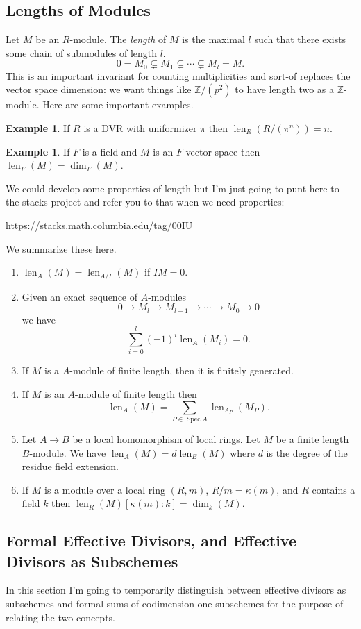 \documentclass[12pt]{article}
\numberwithin{equation}{section}
\theoremstyle{definition}
\newtheorem{example}[theorem]{Example}
\theoremstyle{remark}
\newcommand{\ZZ}{\mathbb{Z}}
\newcommand{\Spec}{\operatorname{Spec}}
\newcommand{\len}{\operatorname{len}}
\begin{document}
\subsection{Lengths of Modules}
Let $M$ be an $R$-module. 
The \emph{length} of $M$ is the maximal $l$ such that there exists some chain of submodules of length $l$. 
 $$ 0 = M_0 \subsetneq M_1 \subsetneq \cdots \subsetneq M_l = M. $$
This is an important invariant for counting multiplicities and sort-of replaces the vector space dimension: we want things like $\ZZ/(p^2)$ to have length two as a $\ZZ$-module. 
Here are some important examples.
\begin{example}
	If $R$ is a DVR with uniformizer $\pi$ then $\len_R(R/(\pi^n)) = n$.
\end{example}
\begin{example}
	If $F$ is a field and $M$ is an $F$-vector space then $\len_F(M)=\dim_F(M)$.
\end{example}

We could develop some properties of length but I'm just going to punt here to the stacks-project and refer you to that when we need properties:
\begin{center}
	\url{https://stacks.math.columbia.edu/tag/00IU}
\end{center}
We summarize these here.
\begin{enumerate}
	\item $\len_A(M) = \len_{A/I}(M)$ if $IM=0$. 
	\item Given an exact sequence of $A$-modules 
	 $$ 0 \to M_l \to M_{l-1} \to \cdots \to M_0 \to 0 $$
	 we have 
	  $$\sum_{i=0}^l (-1)^i \len_A(M_i) =0. $$
	\item If $M$ is a $A$-module of finite length, then it is finitely generated.
	\item If $M$ is an $A$-module of finite length then
	 $$ \len_A(M) = \sum_{P \in \Spec A} \len_{A_P}(M_P).$$
	\item Let $A \to B$ be a local homomorphism of local rings. 
	Let $M$ be a finite length $B$-module. 
	We have $\len_A(M) = d\len_B(M)$ where $d$ is the degree of the residue field extension. 
	\item If $M$ is a module over a local ring $(R,m)$, $R/m=\kappa(m)$, and $R$ contains a field $k$ then $\len_R(M) [\kappa(m):k] = \dim_k(M)$. 
\end{enumerate}


\subsection{Formal Effective Divisors, and Effective Divisors as Subschemes}
In this section I'm going to temporarily distinguish between effective divisors as subschemes and formal sums of codimension one subschemes for the purpose of relating the two concepts. 
\end{document}

